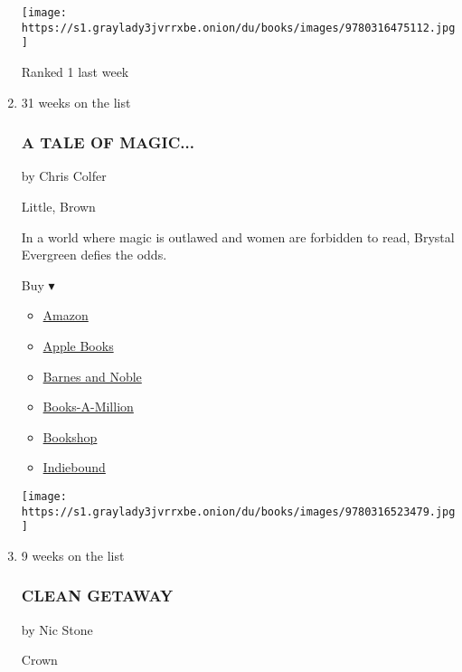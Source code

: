 \begin{enumerate}
  \texttt{[image: https://s1.graylady3jvrrxbe.onion/du/books/images/9780316475112.jpg]}

  Ranked 1 last week
\item
  31 weeks on the list

  \hypertarget{a-tale-of-magic}{%
  \subsubsection{A TALE OF MAGIC...}\label{a-tale-of-magic}}

  by Chris Colfer

  Little, Brown

  In a world where magic is outlawed and women are forbidden to read,
  Brystal Evergreen defies the odds.

  Buy ▾

  \begin{itemize}
  \tightlist
  \item
    \href{https://www.amazon.com/Tale-Magic-Chris-Colfer/dp/031652347X?tag=NYTBS-20}{Amazon}
  \item
    \href{https://du-gae-books-dot-nyt-du-prd.appspot.com/buy?title=A+TALE+OF+MAGIC...\&author=Chris+Colfer}{Apple
    Books}
  \item
    \href{https://www.anrdoezrs.net/click-7990613-11819508?url=https\%3A\%2F\%2Fwww.barnesandnoble.com\%2Fw\%2F\%3Fean\%3D9780316523479}{Barnes
    and Noble}
  \item
    \href{https://www.anrdoezrs.net/click-7990613-35140?url=https\%3A\%2F\%2Fwww.booksamillion.com\%2Fp\%2FA\%2BTALE\%2BOF\%2BMAGIC...\%2FChris\%2BColfer\%2F9780316523479}{Books-A-Million}
  \item
    \href{https://bookshop.org/a/3546/9780316523479}{Bookshop}
  \item
    \href{https://www.indiebound.org/book/9780316523479?aff=NYT}{Indiebound}
  \end{itemize}

  \texttt{[image: https://s1.graylady3jvrrxbe.onion/du/books/images/9780316523479.jpg]}
\item
  9 weeks on the list

  \hypertarget{clean-getaway}{%
  \subsubsection{CLEAN GETAWAY}\label{clean-getaway}}

  by Nic Stone

  Crown


\end{enumerate}
